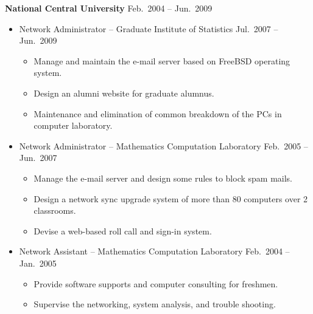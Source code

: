 \documentclass[a4paper,10pt,dvipdfmx]{article}
\begin{document}
\textbf{National Central University} \hfill Feb.~2004 -- Jun.~2009
\begin{itemize}[noitemsep,nolistsep]
  \item[] Network Administrator -- Graduate Institute of Statistics \hfill Jul.~2007 -- Jun.~2009
    \begin{itemize}[noitemsep,nolistsep]
      \item Manage and maintain the e-mail server based on FreeBSD operating system.
      \item Design an alumni website for graduate alumnus.
      \item Maintenance and elimination of common breakdown of the PCs in computer laboratory.
    \end{itemize}
  \item[] Network Administrator -- Mathematics Computation Laboratory \hfill Feb.~2005 -- Jun.~2007
    \begin{itemize}[noitemsep,nolistsep]
      \item Manage the e-mail server and design some rules to block spam mails.
      \item Design a network sync upgrade system of more than 80 computers over 2 classrooms.
      \item Devise a web-based roll call and sign-in system.
    \end{itemize}
  \item[] Network Assistant -- Mathematics Computation Laboratory \hfill Feb.~2004 -- Jan.~2005
    \begin{itemize}[noitemsep,nolistsep]
      \item Provide software supports and computer consulting for freshmen.
      \item Supervise the networking, system analysis, and trouble shooting.
    \end{itemize}
\end{itemize}
\end{document}
